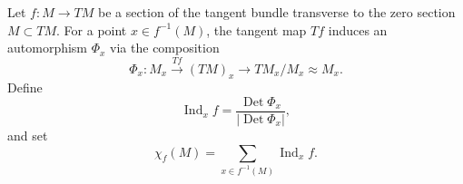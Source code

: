 Let $f \colon M \to TM$ be a section of the tangent bundle transverse to the zero section $M \subset TM$. For a point $x \in f^{-1}(M)$, the tangent map $Tf$ induces an automorphism $\Phi_{x}$ via the composition
$$
\Phi_{x} \colon M_{x} \xrightarrow{Tf} (TM)_{x} \to TM_{x} / M_{x} \approx M_{x}.
$$
Define
$$
\operatorname{Ind}_{x} f = \frac{\operatorname{Det} \Phi_{x}}{|\operatorname{Det} \Phi_{x}|},
$$
and set
$$
\chi_{f}(M) = \sum_{x \in f^{-1}(M)} \operatorname{Ind}_{x} f.
$$
